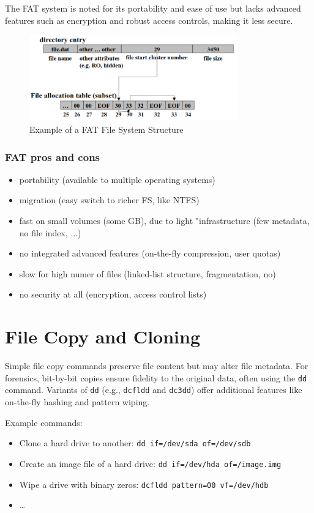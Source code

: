 The FAT system is noted for its portability and ease of use but lacks advanced features such as encryption and robust access controls, making it less secure.

\begin{figure}[ht]
    \centering
    \includegraphics[width=0.8\textwidth]{img/fat.png}
    \caption{Example of a FAT File System Structure}
    \label{fig:fat_file_system}
\end{figure}

\subsubsection{FAT pros and cons}
\begin{itemize}
    \item portability (available to multiple operating systems)
    \item migration (easy switch to richer FS, like NTFS)
    \item fast on small volumes (some GB), due to light "infrastructure (few metadata, no file index, ...)
    \item no integrated advanced features (on-the-fly compression, user quotas)
    \item slow for high numer of files (linked-list structure, fragmentation, no)
    \item no security at all (encryption, access control lists)
\end{itemize}

\section{File Copy and Cloning}

Simple file copy commands preserve file content but may alter file metadata. For forensics, bit-by-bit copies ensure fidelity to the original data, often using the \texttt{dd} command. Variants of \texttt{dd} (e.g., \texttt{dcfldd} and \texttt{dc3dd}) offer additional features like on-the-fly hashing and pattern wiping.

Example commands:
\begin{itemize}
    \item Clone a hard drive to another: \texttt{dd if=/dev/sda of=/dev/sdb}
    \item Create an image file of a hard drive: \texttt{dd if=/dev/hda of=/image.img}
    \item Wipe a drive with binary zeros: \texttt{dcfldd pattern=00 vf=/dev/hdb}
    \item \dots
\end{itemize}

